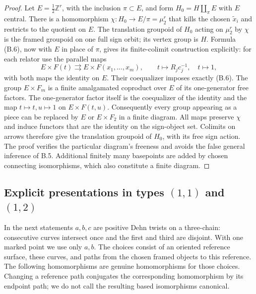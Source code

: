 \begin{proof}
Let $E=\tfrac12\mathbb Z^r$, with the inclusion
$\pi\subset E$, and form $H_0=H\amalg_{\pi}E$ with $E$ central.
There is a homomorphism $\chi:H_0\to E/\pi=\mu_2^r$ that kills the
chosen $\widetilde x_i$ and restricts to the quotient on $E$.
The translation groupoid of $H_0$ acting on $\mu_2^r$ by $\chi$ is
the framed groupoid on one full sign orbit; its vertex group is
$H$.  Formula (B.6), now with $E$ in place of $\pi$, gives its
finite-colimit construction explicitly: for each relator use the
parallel maps
\[
 E\times F(t)\rightrightarrows E\times F(x_1,\ldots,x_m),
 \qquad t\mapsto R_jc_j^{-1},\quad t\mapsto1,
 \tag{B.7}
\]
with both maps the identity on $E$.  Their coequalizer imposes
exactly (B.6).  The group $E\times F_m$ is a finite amalgamated
coproduct over $E$ of its one-generator free factors.  The
one-generator factor itself is the coequalizer of the identity
and the map $t\mapsto t,u\mapsto1$ on $E\times F(t,u)$.
Consequently every group appearing as a piece can be replaced by
$E$ or $E\times F_2$ in a finite diagram.  All maps preserve
$\chi$ and induce functors that are the identity on the sign-object
set.  Colimits on arrows therefore give the translation groupoid
of $H_0$, with its free sign action.  The proof verifies the
particular diagram's freeness and avoids the false general
inference of B.5.  Additional finitely many basepoints are added
by chosen connecting isomorphisms, which also constitute a finite
diagram.
\end{proof}

\subsection{Explicit presentations in types $(1,1)$ and $(1,2)$}

In the next statements $a,b,c$ are positive Dehn twists on a
three-chain: consecutive curves intersect once and the first and
third are disjoint.  With one marked point we use only $a,b$.
The choices consist of an oriented reference surface, these curves,
and paths from the chosen framed objects to this reference.  The
following homomorphisms are genuine homomorphisms for those choices.
Changing a reference path conjugates the corresponding
homomorphism by its endpoint path; we do not call the resulting
based isomorphisms canonical.

